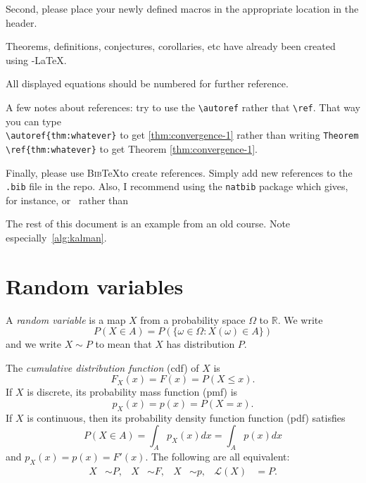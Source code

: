 \documentclass[10pt]{article}
\newcommand{\R}{\mathbb{R}}
\begin{document}
Second, please place your newly defined macros in the appropriate
location in the header.

Theorems, definitions, conjectures, corollaries, etc have already been
created using \AmS-\LaTeX.

All displayed equations should be numbered for further reference. 

A few notes about references: try to use the \verb|\autoref| rather
that \verb|\ref|. That way you can type \\ \verb|\autoref{thm:whatever}|
to get \autoref{thm:convergence-1} rather than writing \verb|Theorem \ref{thm:whatever}| 
to get Theorem \ref{thm:convergence-1}. 

Finally, please use \textsc{Bib}\TeX to create references. Simply add
new references to the {\tt .bib} file in the repo. Also, I recommend
using the {\tt natbib} package which gives, for instance,
\citep{Vapnik1998} or~\citet{Vapnik1998} rather than~\cite{Vapnik1998}

The rest of this document is an example from an old course. Note
especially~\autoref{alg:kalman}.

\section{Random variables}


A {\em random variable} is a map $X$ from a probability space $\Omega$ to $\R$. We write
\begin{equation}
  P(X\in A)=P(\{\omega\in\Omega : X(\omega)\in A\})\label{eq:1}
\end{equation}
and we write $X \sim P$ to mean that $X$ has distribution $P$. 

The {\em cumulative distribution function} (cdf) of $X$ is
\begin{equation}
  F_X(x) = F(x) = P(X \leq x).\label{eq:2}
\end{equation}
If $X$ is discrete, its probability mass function (pmf) is
\begin{equation}
p_X(x) = p(x) = P(X = x).\label{eq:3}
\end{equation}
If $X$ is continuous, then its probability density function function (pdf) satisfies
\begin{equation}
P(X \in A) = \int_A p_X(x)dx = \int_A p(x)dx\label{eq:4}
\end{equation}
and $p_X(x) = p(x) = F'(x)$. The following are all equivalent:
\begin{align}
  X&\sim P,& X&\sim F, & X&\sim p, & \mathcal{L}(X)&=P.
\end{align}
\end{document}
